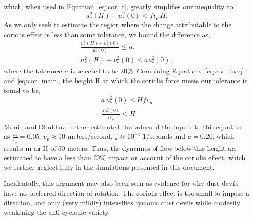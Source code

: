 which, when used in Equation~\ref{eq:cor_f}, greatly simplifies our
inequality to, 
\begin{equation}
u^2_*(H) - u^2_*(0)  < f v_p \, H. 
\label{eq:cor_main}
\end{equation}
As we only seek to estimate the region where the change attributable to
the coriolis effect is less than some tolerance, we bound
the difference as,
\begin{align}
 \frac{u^2_*(H) - u^2_*(0)}{u^2_*(0)} \leq a, \\
 u^2_*(H) - u^2_*(0)\leq a u^2_*(0),
\label{eq:cor_ineq}
\end{align}
where the tolerance $a$ is selected to be 20\%. Combining
Equations~\ref{eq:cor_ineq} and \ref{eq:cor_main}, the height H at which
the coriolis force meets our tolerance is found to be,
\begin{align}
 a \, u^2_*(0) \leq H f v_p \\
 \boxed{\frac{a u^2_*(0)}{f v_p} \leq H}.
\end{align}
Monin and Obukhov further estimated the values of the inputs to this
equation as $\frac{u_*}{v_p} = 0.05$, $v_p \approx 10$ meters/second, $f
\approx 10^{-4}$ 1/seconds and $a=0.20$, which results in an H of 50
meters. Thus, the dynamics of flow below this height are estimated to
have a less than 20\% impact on account of the coriolis effect, which we
further neglect fully in the simulations presented in this document. 

Incidentally, this argument may also been seen as evidence for why dust
devils have no preferred direction of rotation. The coriolis effect is
too small to impose a direction, and only (very mildly) intensifies
cyclonic dust devils while modestly weakening the anti-cyclonic variety.